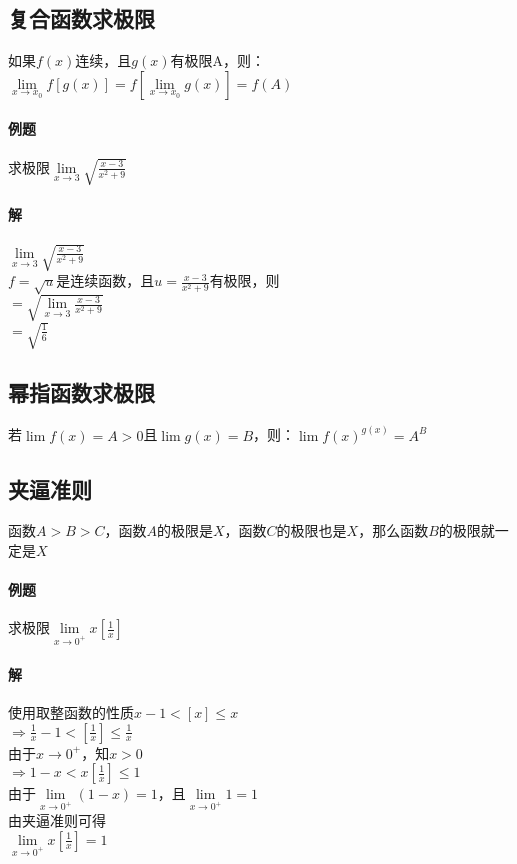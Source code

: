 \documentclass{article}
\begin{document}
\begin{flushleft}
	\subsection{复合函数求极限}
	如果$f(x)$连续，且$g(x)$有极限A，则：\\
	$\lim\limits_{x\to x_0} f[g(x)]=f[\lim\limits_{x\to x_0}g(x)]=f(A)$\\
	
	\paragraph{例题}
	求极限$\lim\limits_{x\to 3}\sqrt{\frac{x-3}{x^2+9}}$
	\paragraph{解}
	$\lim\limits_{x\to 3}\sqrt{\frac{x-3}{x^2+9}}$\\
	$f=\sqrt{u}$是连续函数，且$u=\frac{x-3}{x^2+9}$有极限，则\\
	$=\sqrt{\lim\limits_{x\to 3}\frac{x-3}{x^2+9}}$\\
	$=\sqrt{\frac{1}{6}}$\\
	
	\subsection{幂指函数求极限}
	若$\lim f(x)=A>0$且$\lim g(x)=B$，则：$\lim f(x)^{g(x)}=A^B$\\
	
	\subsection{夹逼准则}
	函数$A>B>C$，函数$A$的极限是$X$，函数$C$的极限也是$X$，那么函数$B$的极限就一定是$X$\\
	
	\paragraph{例题}
	求极限$\lim\limits_{x\to 0^+}x[\frac{1}{x}]$
	\paragraph{解}
	使用取整函数的性质$x-1<[x]\le x$\\
	$\Rightarrow \frac{1}{x}-1<[\frac{1}{x}]\le \frac{1}{x}$\\
	由于$x\to 0^+$，知$x>0$\\
	$\Rightarrow 1-x<x[\frac{1}{x}]\le 1$\\
	由于$\lim\limits_{x\to 0^+}(1-x)=1$，且$\lim\limits_{x\to 0^+}1=1$\\
	由夹逼准则可得\\
	$\lim\limits_{x\to 0^+}x[\frac{1}{x}]=1$\\
	

\end{flushleft}
\end{document}
